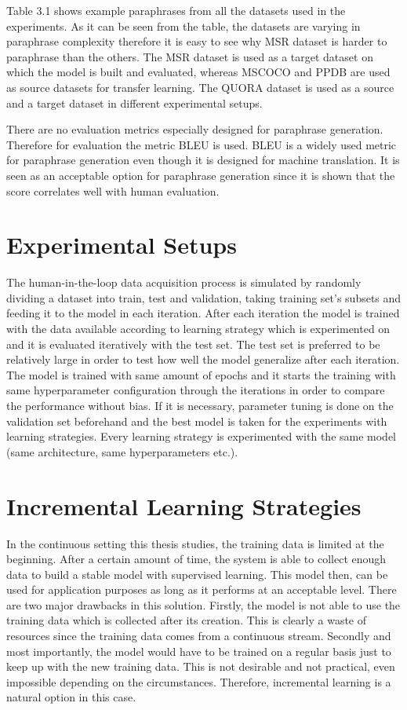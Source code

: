 Table 3.1 shows example paraphrases from all the datasets used in the experiments. As it can be seen from the table, the datasets are varying in paraphrase complexity therefore it is easy to see why MSR dataset is harder to paraphrase than the others. The MSR dataset is used as a target dataset on which the model is built and evaluated, whereas MSCOCO and PPDB are used as source datasets for transfer learning. The QUORA dataset is used as a source and a target dataset in different experimental setups.

There are no evaluation metrics especially designed for paraphrase generation. Therefore for evaluation the metric BLEU \cite{Papinenietal}  is used. BLEU is a widely used metric for paraphrase generation even though it is designed for machine translation. It is seen as an acceptable option for paraphrase generation since it is shown that the score correlates well with human evaluation.

\section{Experimental Setups}

The human-in-the-loop data acquisition process is simulated by randomly dividing a dataset into train, test and validation, taking training set's subsets and feeding it to the model in each iteration. After each iteration the model is trained with the data available according to learning strategy which is experimented on and it is evaluated iteratively with the test set. The test set is preferred to be relatively large in order to test how well the model generalize after each iteration. The model is trained with same amount of epochs and it starts the training with same hyperparameter configuration through the iterations in order to compare the performance without bias. If it is necessary, parameter tuning is done on the validation set beforehand and the best model is taken for the experiments with learning strategies. Every learning strategy is experimented with the same model (same architecture, same hyperparameters etc.).

\section{Incremental Learning Strategies} \label{incs}

In the continuous setting this thesis studies, the training data is limited at the beginning. After a certain amount of time, the system is able to collect enough data to build a stable model with supervised learning. This model then, can be used for application purposes as long as it performs at an acceptable level. There are two major drawbacks in this solution. Firstly, the model is not able to use the training data which is collected after its creation. This is clearly a waste of resources since the training data comes from a continuous stream. Secondly and most importantly, the model would have to be trained on a regular basis just to keep up with the new training data. This is not desirable and not practical, even impossible depending on the circumstances. Therefore, incremental learning is a natural option in this case.

